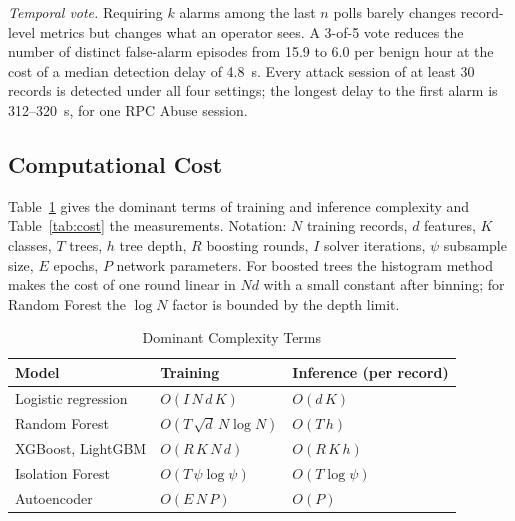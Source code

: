 \documentclass[journal]{IEEEtran}
\begin{document}
\emph{Temporal vote.} Requiring $k$ alarms among the last $n$ polls barely changes record-level metrics but changes what an operator sees. A 3-of-5 vote reduces the number of distinct false-alarm episodes from 15.9 to 6.0 per benign hour at the cost of a median detection delay of 4.8~s. Every attack session of at least 30 records is detected under all four settings; the longest delay to the first alarm is 312--320~s, for one RPC Abuse session.

\subsection{Computational Cost}\label{sec:res-cost}
Table~\ref{tab:complexity} gives the dominant terms of training and inference complexity and Table~\ref{tab:cost} the measurements. Notation: $N$ training records, $d$ features, $K$ classes, $T$ trees, $h$ tree depth, $R$ boosting rounds, $I$ solver iterations, $\psi$ subsample size, $E$ epochs, $P$ network parameters. For boosted trees the histogram method makes the cost of one round linear in $N d$ with a small constant after binning; for Random Forest the $\log N$ factor is bounded by the depth limit.

\begin{table}[t]
\caption{Dominant Complexity Terms}\label{tab:complexity}
\centering\footnotesize
\begin{tabular}{@{}lll@{}}
\toprule
Model & Training & Inference (per record) \\
\midrule
Logistic regression & $O(I\,N\,d\,K)$ & $O(d\,K)$ \\
Random Forest & $O(T\,\sqrt{d}\,N\log N)$ & $O(T\,h)$ \\
XGBoost, LightGBM & $O(R\,K\,N\,d)$ & $O(R\,K\,h)$ \\
Isolation Forest & $O(T\,\psi\log\psi)$ & $O(T\log\psi)$ \\
Autoencoder & $O(E\,N\,P)$ & $O(P)$ \\
\bottomrule
\end{tabular}
\end{table}
\end{document}
